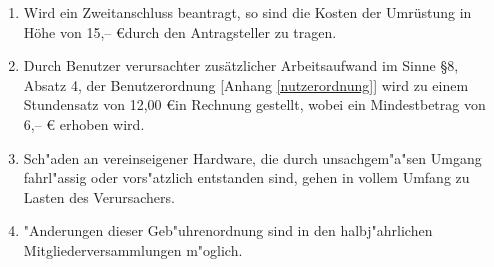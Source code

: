 \begin{enumerate}
\item Wird ein Zweitanschluss beantragt, so sind die Kosten der
  Umrüstung in Höhe von 15,-- \euro durch den Antragsteller zu tragen.

\item Durch Benutzer verursachter zusätzlicher Arbeitsaufwand im Sinne
  §8, Absatz 4, der Benutzerordnung [Anhang \ref{nutzerordnung}] wird zu einem Stundensatz von
  12,00 \euro in Rechnung gestellt, wobei ein Mindestbetrag von 6,-- \euro
  erhoben wird. 


\item Sch"aden an vereinseigener Hardware, die durch unsachgem"a"sen Umgang
  fahrl"assig oder vors"atzlich entstanden sind, gehen in vollem Umfang zu
  Lasten des Verursachers.

\item "Anderungen dieser Geb"uhrenordnung sind in den halbj"ahrlichen
  Mitgliederversammlungen m"oglich.
\end{enumerate}

